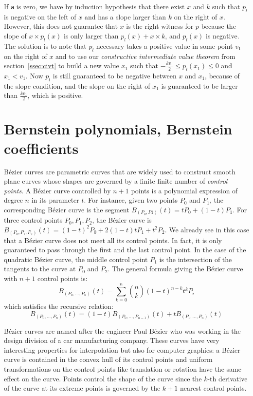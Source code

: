 \documentclass{mscs}
\begin{document}
If {\tt a} is
zero, we have by induction hypothesis that there exist \(x\) and \(k\)
such that \(p_l\) is negative on the left of \(x\) and has a slope larger than
\(k\) on the right of \(x\).  However, this does not guarantee that \(x\) is
the right witness for \(p\) because the slope of \(x\times p_l(x)\) is only
larger than \(p_l(x) + x \times k\), and \(p_l(x)\) is negative.  The solution
is to note that \(p_l\) necessary takes a positive value in some point \(v_1\)
on the right of \(x\) and to use our
{\em constructive intermediate value theorem} from
section~\ref{ssec:civt} to
build a new value \(x_1\) such that \(-\frac{k v_1}{2} \leq p_l(x_1)
\leq 0\) and \(x_1 < v_1\).
Now \(p_l\) is still guaranteed to be negative between \(x\) and \(x_1\),
because of the slope condition, and the slope on the right of \(x_1\) is
guaranteed to be larger than \(\frac{k v_1}{2}\), which is positive.


\section{Bernstein polynomials, Bernstein coefficients}
\label{sec:bernsteindef}
B\'ezier curves \cite{bezier} are parametric curves that are widely used
to construct
smooth plane curves whose shapes are governed by a finite finite number
of \emph{control points}. A B\'ezier curve controlled by $n+1$ points is
a polynomial expression of degree $n$ in its parameter $t$. For
instance, given two points $P_0$ and $P_1$, the corresponding B\'ezier
curve is the segment $B_{(P_0, P1)}(t) = tP_0 + (1 - t)P_1$. For three control
points $P_0, P_1, P_2$, the B\'ezier curve is
$B_{(P_0, P_1, P_2)}(t) = (1 - t)^2P_0 + 2(1 - t)tP_1 + t^2P_2$.
We already see in this case that a B\'ezier
curve does not meet all its control points. In fact, it is only
guaranteed to pass through the first and the last control point. In
the case of the quadratic B\'ezier curve, the middle control point $P_1$
is the intersection of the tangents to the curve at $P_0$ and
$P_2$. The general formula giving the B\'ezier curve with $n+1$ control
points is:
$$B_{(P_0, \dots,P_n)}(t) = \sum_{k = 0}^n \binom{n}{k}(1 - t)^{n - k}t^k P_i$$
which satisfies the recursive relation:
$$B_{(P_0,\dots, P_n)}(t) = (1 - t)B_{(P_0, \dots, P_{n-1})}(t) + tB_{(P_1, \dots, P_n)}(t)$$

B\'ezier curves are named after the engineer Paul B\'ezier who was working
in the design division of a car manufacturing company. These curves have very interesting properties for
interpolation but also for computer graphics: a B\'ezier curve is
contained in the convex hull of its control
points and uniform transformations on the control points like
translation or rotation have the same effect on the curve. Points
control the shape of the curve since the $k$-th derivative of the
curve at its extreme points is governed by the $k+1$ nearest
control points.
\end{document}
